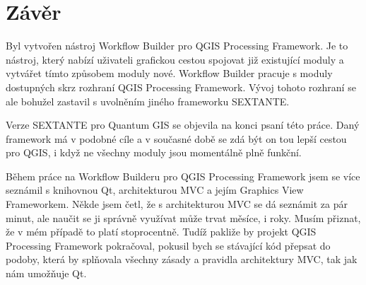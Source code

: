 \chapter*{Závěr}
Byl vytvořen nástroj Workflow Builder pro QGIS Processing Framework. Je to nástroj, který nabízí uživateli grafickou cestou spojovat již existující moduly a vytvářet tímto způsobem moduly nové. Workflow Builder pracuje s moduly dostupných skrz rozhraní QGIS Processing Framework. Vývoj tohoto rozhraní se ale bohužel zastavil s uvolněním jiného frameworku SEXTANTE.

Verze {SEXTANTE} pro Quantum GIS se objevila na konci psaní této práce. Daný framework má v podobné cíle a v současné době se zdá být on tou lepší cestou pro QGIS, i když ne všechny moduly jsou momentálně plně funkční. 

Během práce na Workflow Builderu pro QGIS Processing Framework jsem se více seznámil s knihovnou Qt, architekturou MVC a jejím Graphics View Frameworkem. Někde jsem četl, že s architekturou MVC se dá seznámit za pár minut, ale naučit se ji správně využívat může trvat měsíce, i roky. Musím přiznat, že v mém případě to platí stoprocentně. Tudíž pakliže by projekt QGIS Processing Framework pokračoval, pokusil bych se stávající kód přepsat do podoby, která by splňovala všechny zásady a pravidla architektury MVC, tak jak nám umožňuje Qt.
